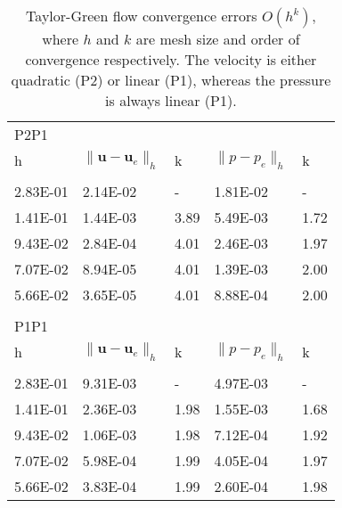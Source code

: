 \documentclass[final,3p,times,twocolumn]{elsarticle}
\begin{document}
\begin{table}[t!]
\caption{Taylor-Green flow convergence errors $O(h^k)$, where $h$ and $k$ are mesh size and order of convergence respectively. The velocity is either quadratic (P2) or linear (P1), whereas the pressure is always linear (P1).}
\label{tab:orderP2P21}
\begin{tabular}{p{4em} p{4em} p{2em} p{4em} p{2em}}
    \\
   P2P1 \\
\rule{0pt}{3ex}    
   h & $\| \bm{u} -\bm{u}_e\|_h $ & k & $\| p-p_e \|_h $  & k  \\
   \hline \\   
   2.83E-01 &   2.14E-02 & -  &   1.81E-02 & - \\ 
   1.41E-01 &   1.44E-03 & 3.89  &   5.49E-03 & 1.72 \\ 
   9.43E-02 &   2.84E-04 & 4.01  &   2.46E-03 & 1.97 \\ 
   7.07E-02 &   8.94E-05 & 4.01  &   1.39E-03 & 2.00 \\ 
   5.66E-02 &   3.65E-05 & 4.01  &   8.88E-04 & 2.00 \\ 
  \hline \\
  P1P1 \\
\rule{0pt}{3ex}    
   h & $\| \bm{u} -\bm{u}_e\|_h $ & k & $\| p-p_e \|_h $  & k  \\
   \hline \\
     2.83E-01 &   9.31E-03 & -  &   4.97E-03 & - \\ 
   1.41E-01 &   2.36E-03 & 1.98  &   1.55E-03 & 1.68 \\ 
   9.43E-02 &   1.06E-03 & 1.98  &   7.12E-04 & 1.92 \\ 
   7.07E-02 &   5.98E-04 & 1.99  &   4.05E-04 & 1.97 \\ 
   5.66E-02 &   3.83E-04 & 1.99  &   2.60E-04 & 1.98 \\ 
   \hline
\end{tabular}
\end{table}
\end{document}
